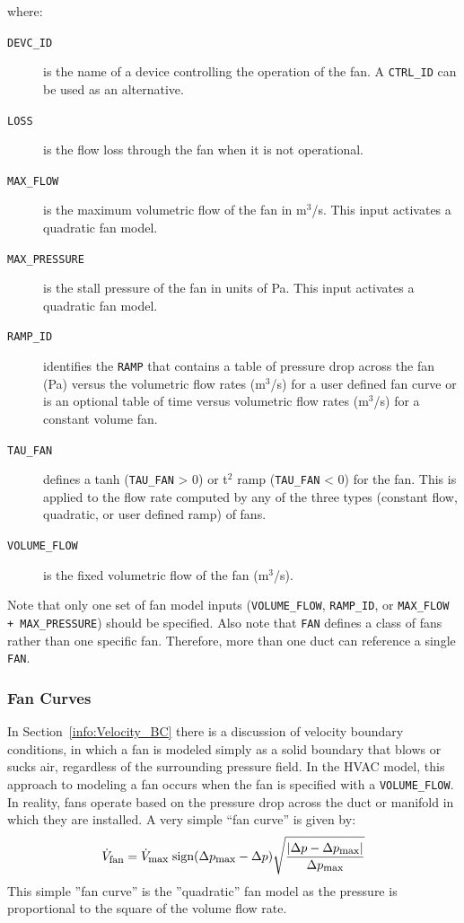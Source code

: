 \documentclass[11pt]{book}
\newcommand{\ct}{\tt\small}
\newcommand{\be}{\begin{equation}}
\newcommand{\ee}{\end{equation}}
\begin{document}
\noindent where:

\begin{description}
\item[{\ct DEVC\_ID}] is the name of a device controlling the operation of the fan. A {\ct CTRL\_ID} can be used as an alternative.
\item[{\ct LOSS}] is the flow loss through the fan when it is not operational.
\item[{\ct MAX\_FLOW}] is the maximum volumetric flow of the fan in m$^3$/s.  This input activates a quadratic fan model.
\item[{\ct MAX\_PRESSURE}] is the stall pressure of the fan in units of Pa.  This input activates a quadratic fan model.
\item[{\ct RAMP\_ID}] identifies the {\ct RAMP} that contains a table of pressure drop across the fan (Pa) versus the volumetric flow rates (m$^3$/s) for a user defined fan curve or is an
optional table of time versus volumetric flow rates (m$^3$/s) for a constant volume fan.
\item[{\ct TAU\_FAN}]  defines a tanh ({\ct TAU\_FAN} > 0) or t$^2$ ramp ({\ct TAU\_FAN} < 0) for the fan.  This is applied to the flow rate computed by any of the three types (constant flow, quadratic, or user defined ramp) of fans.
\item[{\ct VOLUME\_FLOW}] is the fixed volumetric flow of the fan (m$^3$/s).
\end{description}

\noindent
Note that only one set of fan model inputs ({\ct VOLUME\_FLOW}, {\ct RAMP\_ID}, or {\ct MAX\_FLOW + MAX\_PRESSURE}) should be specified.
Also note that {\ct FAN} defines a class of fans rather than one specific fan. Therefore, more than one duct can reference a single {\ct FAN}.

\subsubsection{Fan Curves}
\label{info:Fan_Curves}

In Section~\ref{info:Velocity_BC} there is a discussion of velocity boundary conditions,
in which a fan is modeled simply as a solid boundary that blows or
sucks air, regardless of the surrounding pressure field. In the HVAC model, this approach to modeling a fan occurs when the fan is specified with a {\ct VOLUME\_FLOW}.
In reality, fans operate based on
the pressure drop across the duct or manifold in which they are
installed. A very simple ``fan curve'' is given by:
\be \dot{V}_{\hbox{\footnotesize fan}} = \dot{V}_{\hbox{\footnotesize max}} \;
   \hbox{sign} (\Delta p_{\hbox{\footnotesize max}}-\Delta p)
   \sqrt{ \frac{ |\Delta p - \Delta p_{\hbox{\footnotesize max}}|}{\Delta p_{\hbox{\footnotesize max}} } }  \label{fan_curve} \ee
This simple ''fan curve'' is the ''quadratic'' fan model as the pressure is proportional to the square of the volume flow rate.
\end{document}
